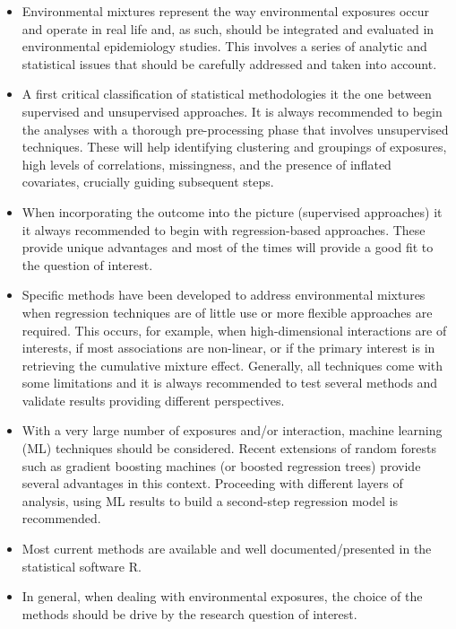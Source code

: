 \documentclass[
]{book}
\begin{document}
\begin{itemize}
\item
  Environmental mixtures represent the way environmental exposures occur and operate in real life and, as such, should be integrated and evaluated in environmental epidemiology studies. This involves a series of analytic and statistical issues that should be carefully addressed and taken into account.
\item
  A first critical classification of statistical methodologies it the one between supervised and unsupervised approaches. It is always recommended to begin the analyses with a thorough pre-processing phase that involves unsupervised techniques. These will help identifying clustering and groupings of exposures, high levels of correlations, missingness, and the presence of inflated covariates, crucially guiding subsequent steps.
\item
  When incorporating the outcome into the picture (supervised approaches) it it always recommended to begin with regression-based approaches. These provide unique advantages and most of the times will provide a good fit to the question of interest.
\item
  Specific methods have been developed to address environmental mixtures when regression techniques are of little use or more flexible approaches are required. This occurs, for example, when high-dimensional interactions are of interests, if most associations are non-linear, or if the primary interest is in retrieving the cumulative mixture effect. Generally, all techniques come with some limitations and it is always recommended to test several methods and validate results providing different perspectives.
\item
  With a very large number of exposures and/or interaction, machine learning (ML) techniques should be considered. Recent extensions of random forests such as gradient boosting machines (or boosted regression trees) provide several advantages in this context. Proceeding with different layers of analysis, using ML results to build a second-step regression model is recommended.
\item
  Most current methods are available and well documented/presented in the statistical software R.
\item
  In general, when dealing with environmental exposures, the choice of the methods should be drive by the research question of interest.


\end{itemize}
\end{document}
